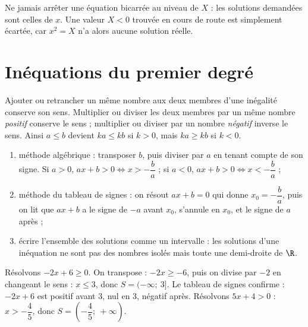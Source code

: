 \begin{attention}
Ne jamais arrêter une équation bicarrée au niveau de $X$ : les solutions demandées sont celles de $x$. Une valeur $X < 0$ trouvée en cours de route est simplement écartée, car $x^{2} = X$ n'a alors aucune solution réelle.
\end{attention}

\section{Inéquations du premier degré}

\begin{propriete}
Ajouter ou retrancher un même nombre aux deux membres d'une inégalité conserve son sens. Multiplier ou diviser les deux membres par un même nombre \emph{positif} conserve le sens ; multiplier ou diviser par un nombre \emph{négatif} inverse le sens. Ainsi $a \leqslant b$ devient $ka \leqslant kb$ si $k > 0$, mais $ka \geqslant kb$ si $k < 0$.
\end{propriete}

\begin{methode}
\begin{enumerate}
  \item méthode algébrique : transposer $b$, puis diviser par $a$ en tenant compte de son signe. Si $a > 0$, $ax + b > 0 \Longleftrightarrow x > -\dfrac{b}{a}$ ; si $a < 0$, $ax + b > 0 \Longleftrightarrow x < -\dfrac{b}{a}$ ;
  \item méthode du tableau de signes : on résout $ax + b = 0$ qui donne $x_{0} = -\dfrac{b}{a}$, puis on lit que $ax + b$ a le signe de $-a$ avant $x_{0}$, s'annule en $x_{0}$, et le signe de $a$ après ;
  \item écrire l'ensemble des solutions comme un intervalle : les solutions d'une inéquation ne sont pas des nombres isolés mais toute une demi-droite de $\R$.
\end{enumerate}
\end{methode}

\begin{exemple}
Résolvons $-2x + 6 \geqslant 0$. On transpose : $-2x \geqslant -6$, puis on divise par $-2$ en changeant le sens : $x \leqslant 3$, donc $S = (-\infty;\ 3]$. Le tableau de signes confirme : $-2x + 6$ est positif avant $3$, nul en $3$, négatif après. Résolvons $5x + 4 > 0$ : $x > -\dfrac{4}{5}$, donc $S = \left(-\dfrac{4}{5};\ +\infty\right)$.
\end{exemple}


